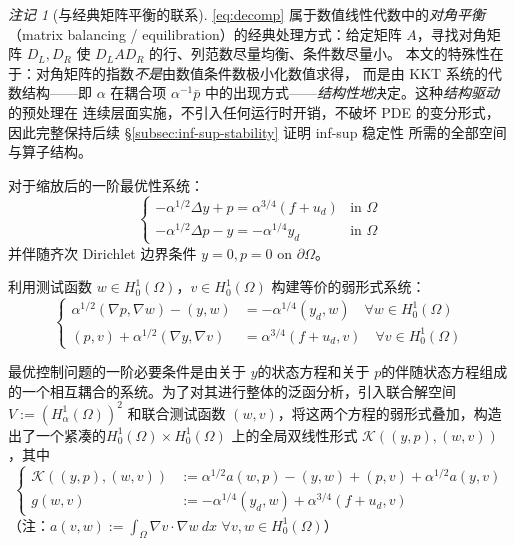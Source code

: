 \documentclass{xmu}
\theoremstyle{plain}
\theoremstyle{remark}
\newtheorem{remark}[theorem]{注记}
\begin{document}
\begin{remark}[与经典矩阵平衡的联系]
\eqref{eq:decomp} 属于数值线性代数中的\emph{对角平衡}\cite{33}
（matrix balancing / equilibration）的经典处理方式：给定矩阵 $A$，寻找对角矩阵
$D_L, D_R$ 使 $D_L A D_R$ 的行、列范数尽量均衡、条件数尽量小。
本文的特殊性在于：对角矩阵的指数\emph{不是}由数值条件数极小化数值求得，
而是由 KKT 系统的代数结构——即 $\alpha$ 在耦合项 $\alpha^{-1}\bar p$
中的出现方式——\emph{结构性地}决定。这种\emph{结构驱动}的预处理在
连续层面实施，不引入任何运行时开销，不破坏 PDE 的变分形式，
因此完整保持后续 §\ref{subsec:inf-sup-stability} 证明 inf-sup 稳定性
所需的全部空间与算子结构。
\end{remark}


\label{subsec:weak-form}

对于缩放后的一阶最优性系统：
\begin{equation*}
  \begin{cases}
  -\alpha^{1/2}\Delta y + p = \alpha^{3/4}(f+u_d) & \text{in } \Omega \\
  -\alpha^{1/2}\Delta p - y = -\alpha^{1/4}y_d & \text{in } \Omega
  \end{cases}
\end{equation*}
并伴随齐次 Dirichlet 边界条件 $y=0, p=0$ on $\partial\Omega$。

利用测试函数 $w \in H_0^1(\Omega)$，$v \in H_0^1(\Omega)$ 构建等价的弱形式系统：
\begin{equation}
  \begin{cases}
  \alpha^{1/2}(\nabla p, \nabla w) - (y, w) &= -\alpha^{1/4}(y_d, w) \quad \forall w \in H_0^1(\Omega) \\
  (p, v) + \alpha^{1/2}(\nabla y, \nabla v) &= \alpha^{3/4}(f+u_d, v) \quad \forall v \in H_0^1(\Omega)
  \end{cases}
\end{equation}

最优控制问题的一阶必要条件是由关于 $y$的状态方程和关于 $p$的伴随状态方程组成的一个相互耦合的系统。为了对其进行整体的泛函分析，引入联合解空间 $V := (H_\alpha^1(\Omega))^2$ 和联合测试函数 $(w, v)$，将这两个方程的弱形式叠加，构造出了一个紧凑的$H_{0}^{1}(\Omega)\times H_{0}^{1}(\Omega)$ 上的全局双线性形式 $\mathcal{K}((y, p), (w, v))$，其中
\begin{equation}
  \begin{cases}
  \mathcal{K}((y,p),(w,v))&:=\alpha^{1/2}a(w,p)-(y,w)+(p,v)+\alpha^{1/2}a(y,v)\\
  g(w,v)&:=-\alpha^{1/4}(y_{d},w)+\alpha^{3/4}(f+u_{d},v)
  \end{cases}
\end{equation}
（注：$a(v,w):=\int_{\Omega}\nabla v\cdot\nabla w~dx$ $\forall v,w\in H_{0}^{1}(\Omega)$）
\end{document}
